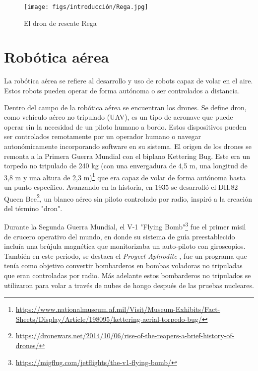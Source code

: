 \begin{figure} [H]
  \begin{center}
    \texttt{[image: figs/introducción/Rega.jpg]}
  \end{center}
  \caption{El dron de rescate Rega}
  \label{fig:Rega}
  \vspace{-1.5em}
\end{figure}

\section{Robótica aérea}
\label{sec:subseccion}
La robótica aérea se refiere al desarrollo y uso de robots capaz de volar en el aire. Estos robots pueden operar de forma autónoma o ser controlados a distancia.

Dentro del campo de la robótica aérea se encuentran los drones. Se define dron, como vehículo aéreo no tripulado (UAV), es un tipo de aeronave que puede operar sin la 
necesidad de un piloto humano a bordo. Estos dispositivos pueden ser controlados remotamente por un operador humano o navegar autonómicamente incorporando software 
en su sistema. 
El origen de los drones se remonta a la Primera Guerra Mundial con el biplano Kettering Bug.
Este era un torpedo no tripulado de 240 kg (con una envergadura de 4,5 m, una longitud de
3,8 m y una altura de 2,3 m)\footnote{\url{https://www.nationalmuseum.af.mil/Visit/Museum-Exhibits/Fact-Sheets/Display/Article/198095/kettering-aerial-torpedo-bug/}} que era capaz 
de volar de forma autónoma hasta un punto específico. 
Avanzando en la historia, en 1935 se desarrolló el DH.82 Queen Bee\footnote{\url{https://dronewars.net/2014/10/06/rise-of-the-reapers-a-brief-history-of-drones/}}, un blanco aéreo
sin piloto controlado por radio, inspiró a la creación del término "dron". 

Durante la Segunda Guerra Mundial, el V-1 "Flying Bomb"\footnote{\url{https://migflug.com/jetflights/the-v1-flying-bomb/}} fue el primer misil
de crucero operativo del mundo, en donde su sistema de guía preestablecido incluía una brújula magnética que monitorizaba un auto-piloto con giroscopios. También en este periodo, se destaca el \textit{Proyect Aphrodite} \cite{Aphrodite}, 
fue un programa que tenía como objetivo convertir bombarderos en bombas voladoras no tripuladas que eran controladas por radio. Más adelante estos bombarderos no tripulados se utilizaron para volar a través de nubes de hongo
después de las pruebas nucleares. 

